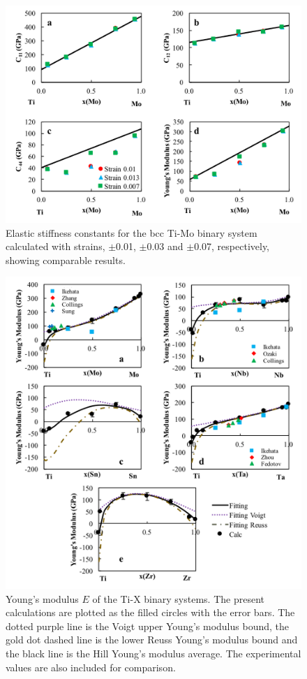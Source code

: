 \pagebreak
\begin{figure}[H]
	\centering
	\includegraphics[width=\textwidth]{Chapter-5/Figures/Strain.png}
	\caption{Elastic stiffness constants for the bcc Ti-Mo binary system calculated with strains, $\pm$0.01, $\pm$0.03 and $\pm$0.07, respectively, showing comparable results.}
	\label{Ch5-figure:Strain}
\end{figure}

\pagebreak
\begin{figure}[H]
	\centering
	\includegraphics[width=\textwidth]{Chapter-5/Figures/tixyoungs.png}
	\caption{Young's modulus $E$ of the Ti-X binary systems. The present calculations are plotted as the filled circles with the error bars. The dotted purple line is the Voigt upper Young's modulus bound, the gold dot dashed line is the lower Reuss Young's modulus bound and the black line is the Hill Young's modulus average. The experimental values \cite{Ikehata2004,Zhang2015,Boyer1994,Sung2015,Ozaki2004,Fedotov1985,Zhou2009a,Zhou2004a,Friak2012,Wu2010a} are also included for comparison. }
	\label{Ch5-figure:tixyoungs}
\end{figure}


